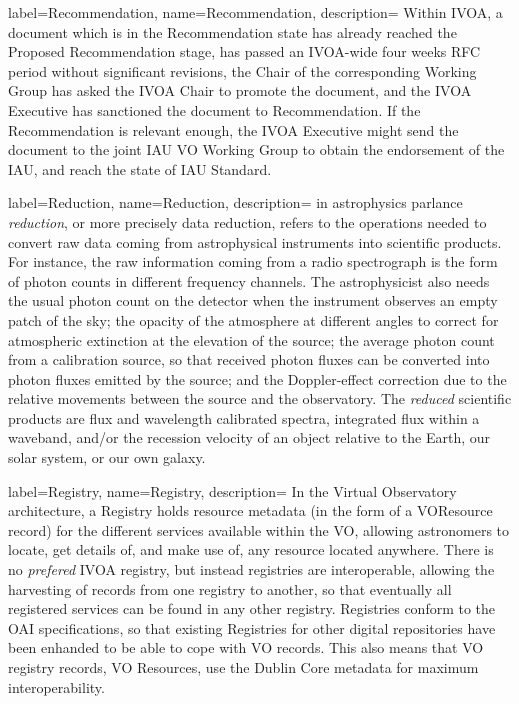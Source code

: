{
    label={Recommendation},
    name={Recommendation},
    description={
    	Within \gls{IVOA}, a document which is in the Recommendation
        state has already reached the \gls{Proposed Recommendation}
        stage, has passed an IVOA-wide four weeks RFC period without
        significant revisions, the Chair of the corresponding
        \gls{Working Group} has asked the IVOA Chair to promote the
        document, and the \gls{IVOA Executive} has sanctioned the
        document to \gls{Recommendation}. If the Recommendation is
        relevant enough, the IVOA Executive might send the document to
        the joint IAU VO Working Group to obtain the endorsement of the
        \gls{IAU}, and reach the state of \gls{IAU Standard}.
    }
}

{
    label={Reduction},
    name={Reduction},
    description={
    	in astrophysics parlance \emph{reduction}, or more precisely
        data reduction, refers to the operations needed to convert raw
        data coming from astrophysical instruments into scientific
        products. For instance, the raw information coming from a radio
        spectrograph is the form of photon counts in different
        frequency channels. The astrophysicist also needs the usual
        photon count on the detector when the instrument observes an
        empty patch of the sky; the opacity of the atmosphere at
        different angles to correct for atmospheric extinction at the
        elevation of the source; the average photon count from a
        calibration source, so that received photon fluxes can be
        converted into photon fluxes emitted by the source; and the
        Doppler-effect correction due to the relative movements between
        the source and the observatory. The \emph{reduced} scientific
        products are flux and wavelength calibrated spectra, integrated
        flux within a waveband, and/or the recession velocity of an
        object relative to the Earth, our solar system, or our own
        galaxy.
    }
}

{
    label={Registry},
    name={Registry},
    description={
    	In the \gls{Virtual Observatory} architecture, a Registry holds
        resource \gls{metadata} (in the form of a \gls{VOResource}
        record) for the different services available within the VO,
        allowing astronomers to locate, get details of, and make use
        of, any resource located anywhere. There is no \emph{prefered}
        IVOA registry, but instead registries are interoperable,
        allowing the \gls{harvesting} of records from one registry to
        another, so that eventually all registered services can be
        found in any other registry. Registries conform to the
        \gls{OAI} specifications, so that existing Registries for other
        digital repositories have been enhanded to be able to cope with
        VO records. This also means that VO registry records, VO
        Resources, use the \gls{Dublin Core} metadata for maximum
        interoperability.
    }
}
 
